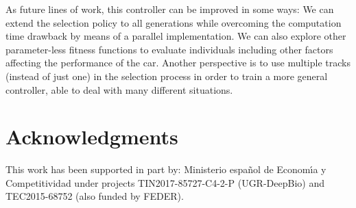 \documentclass[10pt,journal,compsoc]{IEEEtran}
\begin{document}
As future lines of work, this controller can be improved in some ways:
We can extend the selection policy to all generations while overcoming the computation time drawback by means of a parallel implementation.
We can also explore other parameter-less fitness functions to evaluate individuals including other factors affecting the performance of the car.
Another perspective is to use multiple tracks (instead of just one) in the selection process in order to train a more general controller, able to deal with many different situations.

\section*{Acknowledgments}

This work has been supported in part by: Ministerio espa\~{n}ol de
Econom\'{\i}a y Competitividad under projects  TIN2017-85727-C4-2-P (UGR-DeepBio) and TEC2015-68752 (also funded by FEDER).









% 
% 
% 
% 
%
% 
%
\end{document}
